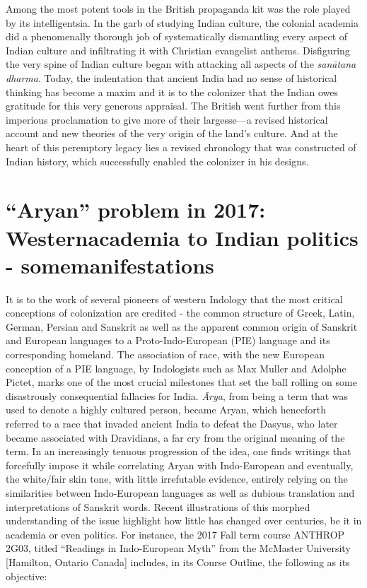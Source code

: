 Among the most potent tools in the British propaganda kit was the role played by its intelligentsia. In the garb of studying Indian culture, the colonial academia did a phenomenally thorough job of systematically dismantling every aspect of Indian culture and infiltrating it with Christian evangelist anthems. Disfiguring the very spine of Indian culture began with attacking all aspects of the \textit{sanātana dharma}. Today, the indentation that ancient India had no sense of historical thinking has become a maxim and it is to the colonizer that the Indian owes gratitude for this very generous appraisal. The British went further from this imperious proclamation to give more of their largesse—a revised historical account and new theories of the very origin of the land’s culture. And at the heart of this peremptory legacy lies a revised chronology that was constructed of Indian history, which successfully enabled the colonizer in his designs.

\newpage


\section{“Aryan” problem in 2017: Western\hfill \break academia to Indian politics - some\hfill \break manifestations}

\vskip -6pt

It is to the work of several pioneers of western Indology that the most critical conceptions of colonization are credited - the common structure of Greek, Latin, German, Persian and Sanskrit as well as the apparent common origin of Sanskrit and European languages to a Proto-Indo-European (PIE) language and its corresponding homeland. The association of race, with the new European conception of a PIE language, by Indologists such as Max Muller and Adolphe Pictet, marks one of the most crucial milestones that set the ball rolling on some disastrously consequential fallacies for India. \textit{Ārya}, from being a term that was used to denote a highly cultured person, became Aryan, which henceforth referred to a race that invaded ancient India to defeat the Dasyus, who later became associated with Dravidians, a far cry from the original meaning of the term. In an increasingly tenuous progression of the idea, one finds writings that forcefully impose it while correlating Aryan with Indo-European and eventually, the white/fair skin tone, with little irrefutable evidence, entirely relying on the similarities between Indo-European languages as well as dubious translation and interpretations of Sanskrit words. Recent illustrations of this morphed understanding of the issue highlight how little has changed over centuries, be it in academia or even politics. For instance, the 2017 Fall term course ANTHROP 2G03, titled “Readings in Indo-European Myth” from the McMaster University [Hamilton, Ontario Canada] includes, in its Course Outline, the following as its objective:

